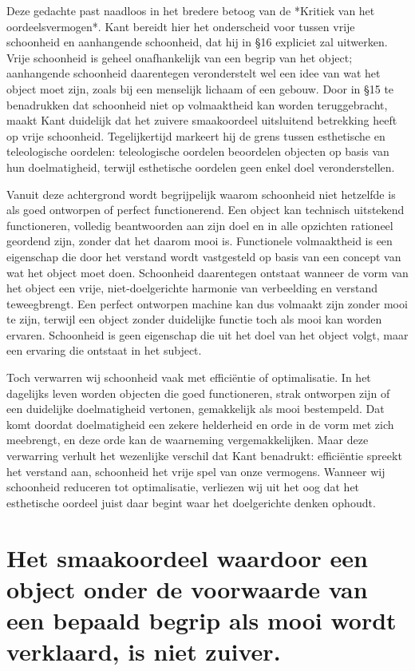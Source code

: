 \begin{mdframed}[leftmargin=0pt,rightmargin=0pt,backgroundcolor=blue!6,linecolor=white,innertopmargin=6pt,innerbottommargin=6pt]
Deze gedachte past naadloos in het bredere betoog van de *Kritiek van het oordeelsvermogen*. Kant bereidt hier het onderscheid voor tussen vrije schoonheid en aanhangende schoonheid, dat hij in §16 expliciet zal uitwerken. Vrije schoonheid is geheel onafhankelijk van een begrip van het object; aanhangende schoonheid daarentegen veronderstelt wel een idee van wat het object moet zijn, zoals bij een menselijk lichaam of een gebouw. Door in §15 te benadrukken dat schoonheid niet op volmaaktheid kan worden teruggebracht, maakt Kant duidelijk dat het zuivere smaakoordeel uitsluitend betrekking heeft op vrije schoonheid. Tegelijkertijd markeert hij de grens tussen esthetische en teleologische oordelen: teleologische oordelen beoordelen objecten op basis van hun doelmatigheid, terwijl esthetische oordelen geen enkel doel veronderstellen.

Vanuit deze achtergrond wordt begrijpelijk waarom schoonheid niet hetzelfde is als goed ontworpen of perfect functionerend. Een object kan technisch uitstekend functioneren, volledig beantwoorden aan zijn doel en in alle opzichten rationeel geordend zijn, zonder dat het daarom mooi is. Functionele volmaaktheid is een eigenschap die door het verstand wordt vastgesteld op basis van een concept van wat het object moet doen. Schoonheid daarentegen ontstaat wanneer de vorm van het object een vrije, niet-doelgerichte harmonie van verbeelding en verstand teweegbrengt. Een perfect ontworpen machine kan dus volmaakt zijn zonder mooi te zijn, terwijl een object zonder duidelijke functie toch als mooi kan worden ervaren. Schoonheid is geen eigenschap die uit het doel van het object volgt, maar een ervaring die ontstaat in het subject.

Toch verwarren wij schoonheid vaak met efficiëntie of optimalisatie. In het dagelijks leven worden objecten die goed functioneren, strak ontworpen zijn of een duidelijke doelmatigheid vertonen, gemakkelijk als mooi bestempeld. Dat komt doordat doelmatigheid een zekere helderheid en orde in de vorm met zich meebrengt, en deze orde kan de waarneming vergemakkelijken. Maar deze verwarring verhult het wezenlijke verschil dat Kant benadrukt: efficiëntie spreekt het verstand aan, schoonheid het vrije spel van onze vermogens. Wanneer wij schoonheid reduceren tot optimalisatie, verliezen wij uit het oog dat het esthetische oordeel juist daar begint waar het doelgerichte denken ophoudt.
\end{mdframed}

\section{Het smaakoordeel waardoor een object onder de voorwaarde van een bepaald begrip als mooi wordt verklaard, is niet zuiver.} %

